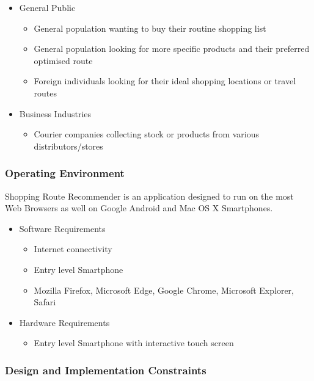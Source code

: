 \documentclass[10pt,twocolumn]{witseiepaper}
\begin{document}
			\begin{itemize}
				\item General Public
				\begin{itemize}
					\item General population wanting to buy their routine shopping list
					\item General population looking for more specific products and their preferred optimised route
					\item Foreign individuals looking for their ideal shopping locations or travel routes
				\end{itemize}
				\item Business Industries
				\begin{itemize}
					\item Courier companies collecting stock or products from various distributors/stores
				\end{itemize}
			\end{itemize}
		
		\subsubsection{Operating Environment}
		
			Shopping Route Recommender is an application designed to run on the most Web Browsers as well on Google Android and Mac OS X Smartphones. 
			
			\begin{itemize}
				\item Software Requirements
				\begin{itemize}
					\item Internet connectivity
					\item Entry level Smartphone
					\item Mozilla Firefox, Microsoft Edge, Google Chrome, Microsoft Explorer, Safari
				\end{itemize}
				\item Hardware Requirements
				\begin{itemize}
					\item Entry level Smartphone with interactive touch screen
				\end{itemize}
			\end{itemize}
		
		\subsubsection{Design and Implementation Constraints} 
		
\end{document}
